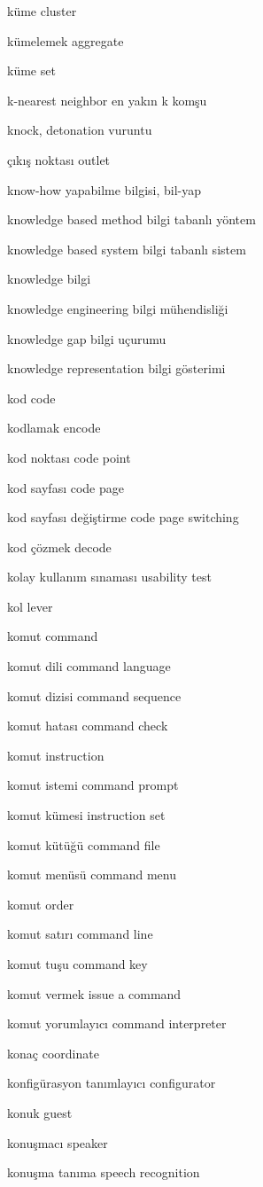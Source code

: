 \documentclass[12pt,fleqn]{article}\usepackage{../../common}
\begin{document}
küme cluster

kümelemek aggregate

küme set

k-nearest neighbor en yakın k komşu

knock, detonation vuruntu

çıkış noktası outlet

know-how yapabilme bilgisi, bil-yap

knowledge based method bilgi tabanlı yöntem

knowledge based system bilgi tabanlı sistem

knowledge bilgi

knowledge engineering bilgi mühendisliği

knowledge gap bilgi uçurumu

knowledge representation bilgi gösterimi

kod code

kodlamak encode

kod noktası code point

kod sayfası code page

kod sayfası değiştirme code page switching

kod çözmek decode

kolay kullanım sınaması usability test

kol lever

komut command

komut dili command language

komut dizisi command sequence

komut hatası command check

komut instruction

komut istemi command prompt

komut kümesi instruction set

komut kütüğü command file

komut menüsü command menu

komut order

komut satırı command line

komut tuşu command key

komut vermek issue a command

komut yorumlayıcı command interpreter

konaç coordinate

konfigürasyon tanımlayıcı configurator

konuk guest

konuşmacı speaker

konuşma tanıma speech recognition
\end{document}
